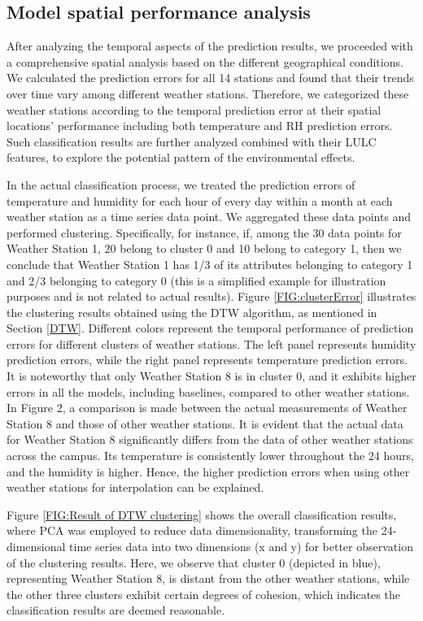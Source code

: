 \documentclass[a4paper,fleqn]{cas-sc}
\begin{document}
\subsection{Model spatial performance analysis}

After analyzing the temporal aspects of the prediction results, we proceeded with a comprehensive spatial analysis based on the different geographical conditions. We calculated the prediction errors for all 14 stations and found that their trends over time vary among different weather stations. Therefore, we categorized these weather stations according to the temporal prediction error at their spatial locations' performance including both temperature and RH prediction errors. Such classification results are further analyzed combined with their LULC features, to explore the potential pattern of the environmental effects. 


In the actual classification process, we treated the prediction errors of temperature and humidity for each hour of every day within a month at each weather station as a time series data point. We aggregated these data points and performed clustering. Specifically, for instance, if, among the 30 data points for Weather Station 1, 20 belong to cluster 0 and 10 belong to category 1, then we conclude that Weather Station 1 has 1/3 of its attributes belonging to category 1 and 2/3 belonging to category 0 (this is a simplified example for illustration purposes and is not related to actual results). Figure \ref{FIG:clusterError} illustrates the clustering results obtained using the DTW algorithm, as mentioned in Section \ref{DTW}. Different colors represent the temporal performance of prediction errors for different clusters of weather stations. The left panel represents humidity prediction errors, while the right panel represents temperature prediction errors. It is noteworthy that only Weather Station 8 is in cluster 0, and it exhibits higher errors in all the models, including baselines, compared to other weather stations. In Figure 2, a comparison is made between the actual measurements of Weather Station 8 and those of other weather stations. It is evident that the actual data for Weather Station 8 significantly differs from the data of other weather stations across the campus. Its temperature is consistently lower throughout the 24 hours, and the humidity is higher. Hence, the higher prediction errors when using other weather stations for interpolation can be explained. 

Figure \ref{FIG:Result of DTW clustering} shows the overall classification results, where PCA was employed to reduce data dimensionality, transforming the 24-dimensional time series data into two dimensions (x and y) for better observation of the clustering results. Here, we observe that cluster 0 (depicted in blue), representing Weather Station 8, is distant from the other weather stations, while the other three clusters exhibit certain degrees of cohesion, which indicates the classification results are deemed reasonable.
\end{document}
